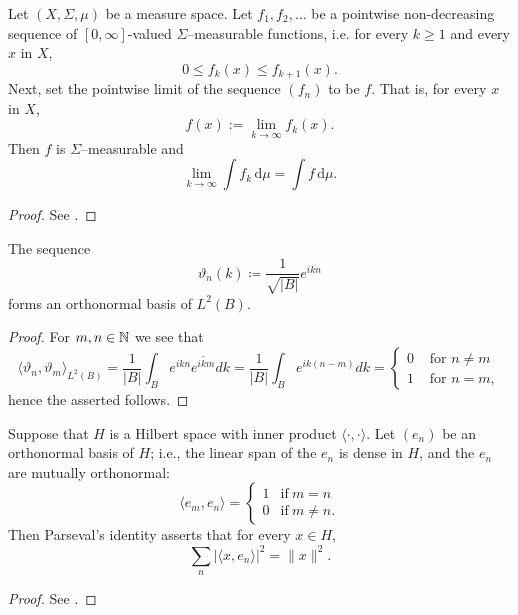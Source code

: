 \begin{atheorem}
	Let $(X, \Sigma, \mu)$ be a measure space. Let $f_1, f_2, \ldots$  be a pointwise non-decreasing sequence of $[0, \infty]$-valued $\Sigma$–measurable functions, i.e. for every $k \geq 1$ and every $x$ in $X$,
		\[ 0 \leq f_k(x) \leq f_{k+1}(x). \] 
	Next, set the pointwise limit of the sequence $(f_{n})$ to be $f$. That is, for every $x$ in $X$,
		\[ f(x):= \lim_{k\to\infty} f_k(x). \]
	Then $f$ is $\Sigma$–measurable and
		\[ \lim_{k\to\infty} \int f_k \, \mathrm{d}\mu = \int f \, \mathrm{d}\mu. \]

	\begin{proof}
		See \cite[p. 516]{werner2006funkana}.
	\end{proof}
\end{atheorem}

\begin{atheorem}
	The sequence
		\[ \vartheta_{n}(k) \coloneqq \frac{1}{\sqrt{|B|}} e^{ikn} \]
	forms an orthonormal basis of $L^{2}(B)$.

	\begin{proof}
		 For $m, n \in \mathbb{N}$ we see that
		 \[ \langle \vartheta_{n}, \vartheta_{m} \rangle_{L^{2}(B)} = \frac{1}{|B|} \int_{B} e^{ikn} \overline{e^{ikm}} dk = \frac{1}{|B|} \int_{B} e^{ik(n-m)} dk = \begin{cases} 0 & \text{ for } n \neq m \\ 1 & \text{ for } n = m, \end{cases} \]
		 hence the asserted follows.
	\end{proof}
\end{atheorem}

\begin{atheorem}
	Suppose that $H$ is a Hilbert space with inner product $\langle \cdot,\cdot \rangle$. Let $(e_{n})$ be an orthonormal basis of $H$; i.e., the linear span of the $e_n$ is dense in $H$, and the $e_n$ are mutually orthonormal:
		\[ \langle e_{m},e_{n}\rangle ={\begin{cases}1&{\mbox{if}}\ m=n\\0&{\mbox{if}}\ m\not =n.\end{cases}} \]
	Then Parseval's identity asserts that for every $x \in H$,
		\[ \sum _{n}|\langle x,e_{n}\rangle |^{2}=\|x\|^{2}.\]

	\begin{proof}
		See \cite[p. 236]{werner2006funkana}.
	\end{proof}
\end{atheorem}

